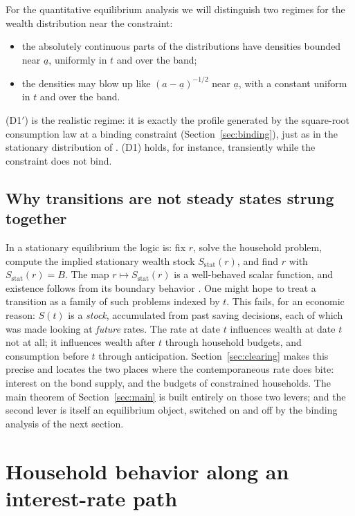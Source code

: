 \documentclass[11pt]{article}
\theoremstyle{definition}
\theoremstyle{remark}
\newcommand{\ubar}[1]{\underline{#1}}
\newcommand{\uba}{\ubar{a}}
\begin{document}
For the quantitative equilibrium analysis we will distinguish two
regimes for the wealth distribution near the constraint:
\begin{itemize}[leftmargin=2.6em]
\item[\textbf{(D1)}] the absolutely continuous parts of the
distributions have densities bounded near $\uba$, uniformly in $t$
and over the band;
\item[\textbf{(D1$'$)}] the densities may blow up like
$(a-\uba)^{-1/2}$ near $\uba$, with a constant uniform in $t$ and
over the band.
\end{itemize}
(D1$'$) is the realistic regime: it is exactly the profile generated
by the square-root consumption law at a binding constraint
(Section~\ref{sec:binding}), just as in the stationary distribution of
\citet{AHLLM2022}. (D1) holds, for instance, transiently while the
constraint does not bind.

\subsection{Why transitions are not steady states strung together}
\label{sec:whyhard}

In a stationary equilibrium the logic is: fix $r$, solve the
household problem, compute the implied stationary wealth stock
$S_{\mathrm{stat}}(r)$, and find $r$ with $S_{\mathrm{stat}}(r)=B$.
The map $r\mapsto S_{\mathrm{stat}}(r)$ is a well-behaved scalar
function, and existence follows from its boundary behavior
\citep{Aiyagari1994,AHLLM2022}. One might hope to treat a transition
as a family of such problems indexed by $t$. This fails, for an
economic reason: $S(t)$ is a \emph{stock}, accumulated from past
saving decisions, each of which was made looking at \emph{future}
rates. The rate at date $t$ influences wealth at date $t$ not at all;
it influences wealth after $t$ through household budgets, and
consumption before $t$ through anticipation. Section~\ref{sec:clearing}
makes this precise and locates the two places where the
contemporaneous rate does bite: interest on the bond supply, and the
budgets of constrained households. The main theorem of
Section~\ref{sec:main} is built entirely on those two levers; and the
second lever is itself an equilibrium object, switched on and off by
the binding analysis of the next section.

\section{Household behavior along an interest-rate path}
\label{sec:household}
\end{document}
